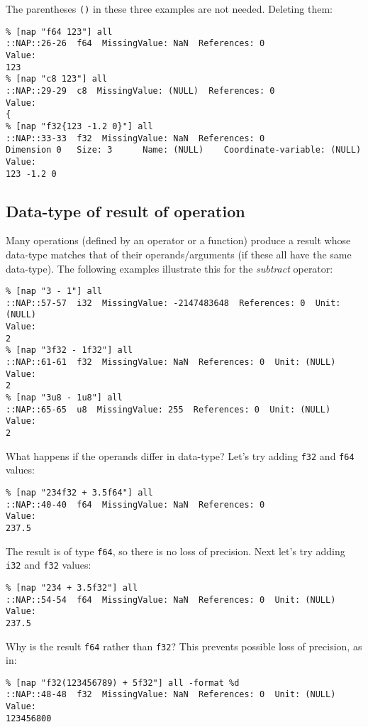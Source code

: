   

The parentheses 
  \texttt{()} in these three examples are not needed. Deleting
  them:
  \begin{verbatim}
% [nap "f64 123"] all
::NAP::26-26  f64  MissingValue: NaN  References: 0
Value:
123
% [nap "c8 123"] all
::NAP::29-29  c8  MissingValue: (NULL)  References: 0
Value:
{
% [nap "f32{123 -1.2 0}"] all
::NAP::33-33  f32  MissingValue: NaN  References: 0
Dimension 0   Size: 3      Name: (NULL)    Coordinate-variable: (NULL)
Value:
123 -1.2 0
\end{verbatim}

  \subsection{
    \label{result}Data-type of result of operation
  }

  

Many operations (defined by an operator or a function) produce a
  result whose data-type matches that of their operands/arguments (if
  these all have the same data-type). The following examples illustrate
  this for the 
  \emph{subtract} operator:
  \begin{verbatim}
% [nap "3 - 1"] all
::NAP::57-57  i32  MissingValue: -2147483648  References: 0  Unit:
(NULL)
Value:
2
% [nap "3f32 - 1f32"] all
::NAP::61-61  f32  MissingValue: NaN  References: 0  Unit: (NULL)
Value:
2
% [nap "3u8 - 1u8"] all
::NAP::65-65  u8  MissingValue: 255  References: 0  Unit: (NULL)
Value:
2
\end{verbatim}

  

What happens if the operands differ in data-type? Let's try
  adding 
  \texttt{f32} and 
  \texttt{f64} values:
  \begin{verbatim}
% [nap "234f32 + 3.5f64"] all
::NAP::40-40  f64  MissingValue: NaN  References: 0
Value:
237.5
\end{verbatim}

The result is of type 
  \texttt{f64}, so there is no loss of precision. Next let's
  try adding 
  \texttt{i32} and 
  \texttt{f32} values:
  \begin{verbatim}
% [nap "234 + 3.5f32"] all
::NAP::54-54  f64  MissingValue: NaN  References: 0  Unit: (NULL)
Value:
237.5
\end{verbatim}

  

Why is the result 
  \texttt{f64} rather than 
  \texttt{f32}? This prevents possible loss of precision, as
  in:
  \begin{verbatim}
% [nap "f32(123456789) + 5f32"] all -format %d
::NAP::48-48  f32  MissingValue: NaN  References: 0  Unit: (NULL)
Value:
123456800
\end{verbatim}


